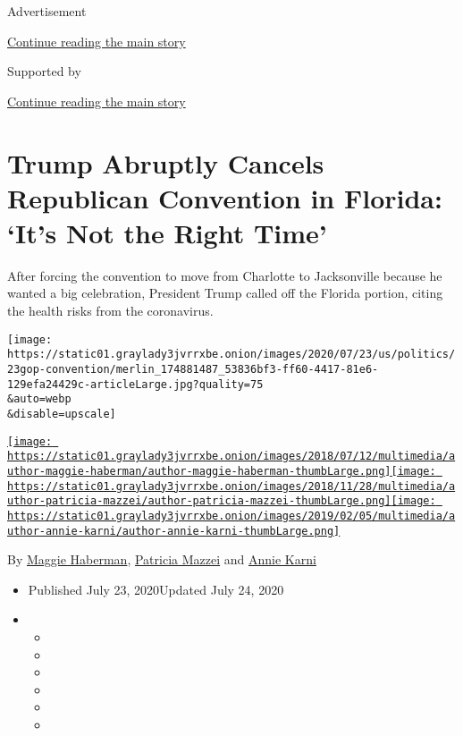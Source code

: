 Advertisement

\protect\hyperlink{after-top}{Continue reading the main story}

Supported by

\protect\hyperlink{after-sponsor}{Continue reading the main story}

\hypertarget{trump-abruptly-cancels-republican-convention-in-florida-its-not-the-right-time}{%
\section{Trump Abruptly Cancels Republican Convention in Florida: `It's
Not the Right
Time'}\label{trump-abruptly-cancels-republican-convention-in-florida-its-not-the-right-time}}

After forcing the convention to move from Charlotte to Jacksonville
because he wanted a big celebration, President Trump called off the
Florida portion, citing the health risks from the coronavirus.

\texttt{[image: https://static01.graylady3jvrrxbe.onion/images/2020/07/23/us/politics/23gop-convention/merlin\_174881487\_53836bf3-ff60-4417-81e6-129efa24429c-articleLarge.jpg?quality=75\\\&auto=webp\\\&disable=upscale]}

\href{https://www.nytimes3xbfgragh.onion/by/maggie-haberman}{\texttt{[image: https://static01.graylady3jvrrxbe.onion/images/2018/07/12/multimedia/author-maggie-haberman/author-maggie-haberman-thumbLarge.png]}}\href{https://www.nytimes3xbfgragh.onion/by/patricia-mazzei}{\texttt{[image: https://static01.graylady3jvrrxbe.onion/images/2018/11/28/multimedia/author-patricia-mazzei/author-patricia-mazzei-thumbLarge.png]}}\href{https://www.nytimes3xbfgragh.onion/by/annie-karni}{\texttt{[image: https://static01.graylady3jvrrxbe.onion/images/2019/02/05/multimedia/author-annie-karni/author-annie-karni-thumbLarge.png]}}

By \href{https://www.nytimes3xbfgragh.onion/by/maggie-haberman}{Maggie
Haberman},
\href{https://www.nytimes3xbfgragh.onion/by/patricia-mazzei}{Patricia
Mazzei} and
\href{https://www.nytimes3xbfgragh.onion/by/annie-karni}{Annie Karni}

\begin{itemize}
\item
  Published July 23, 2020Updated July 24, 2020
\item
  \begin{itemize}
  \item
  \item
  \item
  \item
  \item
  \item
  \end{itemize}
\end{itemize}

